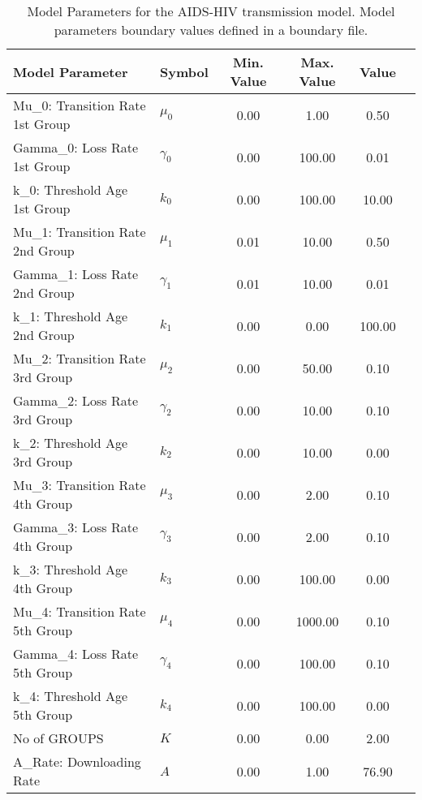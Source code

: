 \begin{table}
\centering
\begin{tabular}{p{5cm}lcccc}
{\bf Model Parameter} & {\bf Symbol} & {\bf Min. Value} & {\bf Max. Value} & {\bf Value}\\
\hline\hline
Mu_0: Transition Rate 1st Group & $\mu_0$ & 0.00 & 1.00 & 0.50\\
Gamma_0: Loss Rate 1st Group & $\gamma_0$ & 0.00 & 100.00 & 0.01\\
k_0: Threshold Age 1st Group & $k_0$ & 0.00 & 100.00 & 10.00\\
Mu_1: Transition Rate 2nd Group & $\mu_1$ & 0.01 & 10.00 & 0.50\\
Gamma_1: Loss Rate 2nd Group & $\gamma_1$ & 0.01 & 10.00 & 0.01\\
k_1: Threshold Age 2nd Group & $k_1$ & 0.00 & 0.00 & 100.00\\
Mu_2: Transition Rate 3rd Group & $\mu_2$ & 0.00 & 50.00 & 0.10\\
Gamma_2: Loss Rate 3rd Group & $\gamma_2$ & 0.00 & 10.00 & 0.10\\
k_2: Threshold Age 3rd Group & $k_2$ & 0.00 & 10.00 & 0.00\\
Mu_3: Transition Rate 4th Group & $\mu_3$ & 0.00 & 2.00 & 0.10\\
Gamma_3: Loss Rate 4th Group & $\gamma_3$ & 0.00 & 2.00 & 0.10\\
k_3: Threshold Age 4th Group & $k_3$ & 0.00 & 100.00 & 0.00\\
Mu_4: Transition Rate 5th Group & $\mu_4$ & 0.00 & 1000.00 & 0.10\\
Gamma_4: Loss Rate 5th Group & $\gamma_4$ & 0.00 & 100.00 & 0.10\\
k_4: Threshold Age 5th Group & $k_4$ & 0.00 & 100.00 & 0.00\\
No of GROUPS & $K$ & 0.00 & 0.00 & 2.00\\
A_Rate: Downloading Rate & $A$ & 0.00 & 1.00 & 76.90\\
\hline\hline
\end{tabular}
\caption{Model Parameters for the AIDS-HIV transmission model. Model parameters boundary values defined in a boundary file.}
\end{table}
